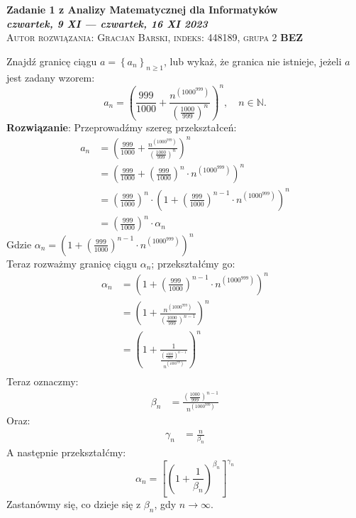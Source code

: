 \documentclass[12pt]{article}
\newcommand{\N}{\mathbb{N}}
\begin{document}
\pagestyle{empty}

\begin{center}
{\bf Zadanie 1 z Analizy Matematycznej dla Informatyków \\ {\em czwartek, 9 XI --- czwartek, 16 XI  2023}}\\
\textsc{Autor rozwiązania: Gracjan Barski, indeks: 448189, grupa 2} \textbf{BEZ}
\end{center}

Znajdź granicę ciągu $a=\left\{a_n\right\}_{n\geq1}$, lub wykaż, że granica nie 
istnieje, jeżeli $a$  jest zadany wzorem:
$$a_n=\left(\frac{999}{1000}+\frac{n^{(1000^{999})}}{\left(\frac{1000}{999}\right)^n}\right)^n, \quad n\in\N.$$
\textbf{Rozwiązanie}:
Przeprowadźmy szereg przekształceń:
\begin{align*}
    a_n &= \left(\frac{999}{1000}+\frac{n^{(1000^{999})}}{\left(\frac{1000}{999}\right)^n}\right)^n \\
    &= \left(\frac{999}{1000}+\left(\frac{999}{1000}\right)^n \cdot n^{(1000^{999})}\right)^n \\
    &= \left(\frac{999}{1000}\right)^n \cdot \left(1+\left(\frac{999}{1000}\right)^{n-1} \cdot n^{(1000^{999})}\right)^n \\
    &= \left(\frac{999}{1000}\right)^n \cdot \alpha_n
\end{align*}
Gdzie $\alpha_n = \left(1+\left(\frac{999}{1000}\right)^{n-1} \cdot n^{(1000^{999})}\right)^n$ \\[5pt]
Teraz rozważmy granicę ciągu $\alpha_n$; przekształćmy go:
\begin{align*}
    \alpha_n &= \left(1+\left(\frac{999}{1000}\right)^{n-1} \cdot n^{(1000^{999})}\right)^n \\
    &=  \left(1 + \frac{n^{(1000^{999})}}{\left(\frac{1000}{999}\right)^{n-1}}\right)^n \\
    &= \left(1 + \frac{1}{\frac{\left(\frac{1000}{999}\right)^{n-1}}{n^{(1000^{999})}}}\right)^n \\
\end{align*}
Teraz oznaczmy: 
\begin{align*}
\beta_n &= \frac{\left(\frac{1000}{999}\right)^{n-1}}{n^{(1000^{999})}}
\end{align*}
Oraz:
\begin{align*}
\gamma_n &= \frac{n}{\beta_n}
\end{align*}
A następnie przekształćmy:
$$\alpha_n = \left[\left(1 + \frac{1}{\beta_n}\right)^{\beta_n}\right]^{\gamma_n}$$
Zastanówmy się, co dzieje się z $\beta_n$, gdy $n \to \infty$. \\[5pt]
\end{document}
